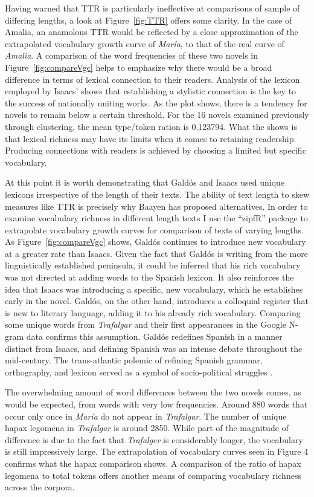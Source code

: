 \documentclass[12pt]{report}
\begin{document}
Having warned that TTR is particularly ineffective at comparisons of sample of differing lengths, a look at Figure~\ref{fig:TTR} offers some clarity.
In the case of Amalia, an anamolous TTR would be reflected by a close approximation of the extrapolated vocabulary growth curve of \textit{María}, to that of the real curve of \textit{Amalia}.
A comparison of the word frequencies of these two novels in Figure~\ref{fig:compareVgc} helps to emphasize why there would be a broad difference in terms of lexical connection to their readers.
Analysis of the lexicon employed by Isaacs' shows that establishing a stylistic connection is the key to the success of nationally uniting works. 
As the plot shows, there is a tendency for novels to remain below a certain threshold.
For the 16 novels examined previously through clustering, the mean type/token ration is 0.123794.
What the shows is that lexical richness may have its limits when it comes to retaining readership. 
Producing connections with readers is achieved by choosing a limited but specific vocabulary.


At this point it is worth demonstrating that Galdós and Isaacs used unique lexicons irrespective of the length of their texts.
The ability of text length to skew measures like TTR is precisely why Baayen has proposed alternatives.
In order to examine vocabulary richness in different length texts I use the \enquote{zipfR} package to extrapolate vocabulary growth curves for comparison of texts of varying lengths.
As Figure~\ref{fig:compareVgc} shows, Galdós continues to introduce new vocabulary at a greater rate than Isaacs.
Given the fact that Galdós is writing from the more linguistically established peninsula, it could be inferred that his rich vocabulary was not directed at adding words to the Spanish lexicon. 
It also reinforces the idea that Isaacs was introducing a specific, new vocabulary, which he establishes early in the novel. 
Galdós, on the other hand, introduces a colloquial register that is new to literary language, adding it to his already rich vocabulary.
Comparing some unique words from \textit{Trafalgar} and their first appearances in the Google N-gram data confirms this assumption.
Galdós redefines Spanish in a manner distinct from Isaacs, and defining Spanish was an intense debate throughout the mid-century.
The trans-atlantic polemic of refining Spanish grammar, orthography, and lexicon served as a symbol of socio-political struggles \cite[230]{Villa2015}.




The overwhelming amount of word differences between the two novels comes, as would be expected, from words with very low frequencies.
Around 880 words that occur only once in \textit{María} do not appear in \textit{Trafalgar}.
The number of unique hapax legomena in \textit{Trafalgar} is around 2850.
While part of the magnitude of difference is due to the fact that \textit{Trafalger} is considerably longer, the vocabulary is still impressively large.
The extrapolation of vocabulary curves seen in Figure 4 confirms what the hapax comparison shows.
A comparison of the ratio of hapax legomena to total tokens offers another means of comparing vocabulary richness across the corpora.
\end{document}
